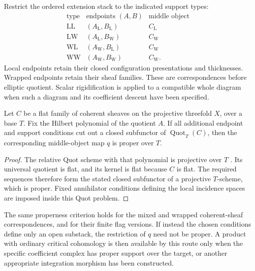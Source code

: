 \begin{definition}
\label{def:local-local-correspondence-datum}
\label{def:mixed-local-wrapped-correspondence-datum}
\label{def:wrapped-wrapped-correspondence-datum}
Restrict the ordered extension stack to the indicated support types:
\[
 \begin{array}{c|c|c}
 \text{type}&\text{endpoints }(A,B)&\text{middle object}\\ \hline
 \mathrm{LL}&(A_{\mathrm L},B_{\mathrm L})&C_{\mathrm L}\\
 \mathrm{LW}&(A_{\mathrm L},B_{\mathrm W})&C_{\mathrm W}\\
 \mathrm{WL}&(A_{\mathrm W},B_{\mathrm L})&C_{\mathrm W}\\
 \mathrm{WW}&(A_{\mathrm W},B_{\mathrm W})&C_{\mathrm W}.
 \end{array}
\]
Local endpoints retain their closed configuration presentations and
thicknesses. Wrapped endpoints retain their sheaf families. These
are correspondences before elliptic quotient. Scalar rigidification
is applied to a compatible whole diagram when such a diagram and
its coefficient descent have been specified.
\end{definition}

\begin{proposition}
\label{prop:local-local-target-properness}
Let $C$ be a flat family of coherent sheaves on the projective
threefold $X$, over a base $T$. Fix the Hilbert polynomial of the
quotient $A$. If all additional endpoint and support conditions
cut out a closed subfunctor of $\operatorname{Quot}_T(C)$, then
the corresponding middle-object map $q$ is proper over $T$.
\end{proposition}

\begin{proof}
The relative Quot scheme with that polynomial is projective over
$T$ \cite[Theorem~2.2.4]{HuybrechtsLehn}. Its universal quotient
is flat, and its kernel is flat because
$C$ is flat. The required sequences therefore form the stated
closed subfunctor of a projective $T$-scheme, which is proper.
Fixed annihilator conditions defining the local incidence spaces
are imposed inside this Quot problem.
\end{proof}

\begin{proposition}
\label{prop:mixed-local-wrapped-target-admissibility}
\label{prop:wrapped-wrapped-target-admissibility}
The same properness criterion holds for the mixed and wrapped
coherent-sheaf correspondences, and for their finite flag versions.
If instead the chosen conditions define only an open substack, the
restriction of $q$ need not be proper. A product with ordinary
critical cohomology is then available by this route only when the
specific coefficient complex has proper support over the target,
or another appropriate integration morphism has been constructed.
\end{proposition}

